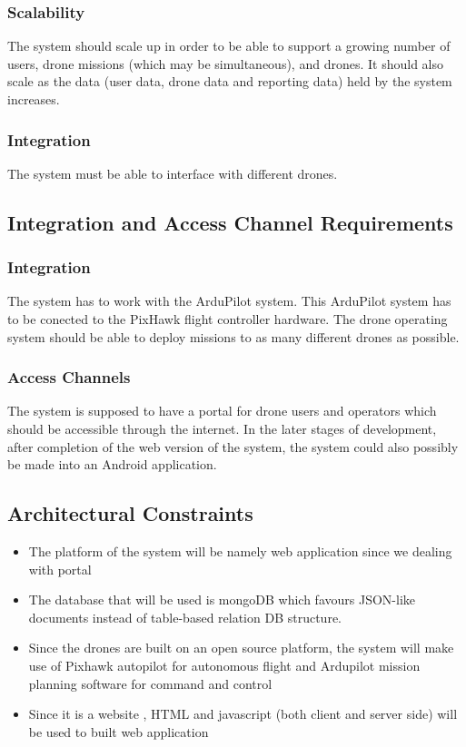\documentclass{article}
\begin{document}
	\subsubsection{Scalability}
	The system should scale up in order to be able to support a growing number of users, drone missions (which may be simultaneous), and drones. It should also scale as the data (user data, drone data and reporting data) held by the system increases.
	
	\subsubsection{Integration}
	The system must be able to interface with different drones.
	\subsection{Integration and Access Channel Requirements}%
	\subsubsection{Integration}
	The system has to work with the ArduPilot system. This ArduPilot system has to be conected to the PixHawk flight controller hardware. The drone operating system should be able to deploy missions to as many different drones as possible.
	\subsubsection{Access Channels}
	The system is supposed to have a portal for drone users and operators which should be accessible through the internet. In the later stages of development, after completion of the web version of the system, the system could also possibly be made into an Android application.
	\subsection{Architectural Constraints }%
	\begin{itemize}
		\item	The platform of the system will  be namely web application since we dealing with portal 
		\item	The database that will be used is mongoDB which favours JSON-like documents instead of table-based relation DB structure.
		\item 	Since the drones are built on an open source platform, the system will make use of Pixhawk autopilot for autonomous flight and Ardupilot mission planning software for command and control
		\item 	Since it is a website , HTML and javascript (both client and server side) will be used to built web application
	\end{itemize}
	
\end{document}

